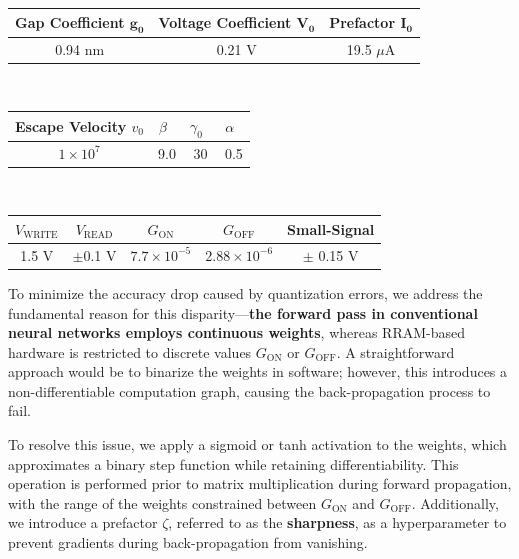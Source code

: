\documentclass[conference]{IEEEtran}  %
\begin{document}
\vspace*{-1mm}
\begin{table}[h]
    \centering
    \renewcommand{\arraystretch}{1.5} %
    \setlength{\tabcolsep}{1mm}       %
    \begin{tabular}{|c|c|c|}
    \hline
        Gap Coefficient $\mathbf{g_0}$ & Voltage Coefficient $\mathbf{V_0}$ & Prefactor $\mathbf{I_0}$ \\\hline
        0.94 nm & 0.21 V & 19.5 $\mu$A \\\hline
    \end{tabular}\\
    \vspace*{2mm}
    \renewcommand{\arraystretch}{1.5} %
    \begin{tabular}{|c|c|c|c|}
    \hline
        Escape Velocity $v_0$ & $\beta$~\cite{b2} & $\gamma_0$~\cite{b2} & $\alpha$~\cite{b2} \\\hline
        $1 \times 10^7$ & 9.0 & 30 & 0.5 \\\hline
    \end{tabular}\\
    \vspace*{2mm}
    \renewcommand{\arraystretch}{1.5} %
    \begin{tabular}{|c|c|c|c|c|}
    \hline
        $V_{\text{WRITE}}$ & $V_{\text{READ}}$ & $G_{\text{ON}}$ & $G_{\text{OFF}}$ & Small-Signal \\\hline
        1.5 V & $\pm$0.1 V & $7.7 \times 10^{-5}$ & $2.88 \times 10^{-6}$ & $\pm$ 0.15 V \\\hline
    \end{tabular}
\end{table}

To minimize the accuracy drop caused by quantization errors, we address the fundamental reason for this disparity—\textbf{the forward pass in conventional neural networks employs continuous weights}, whereas RRAM-based hardware is restricted to discrete values \( G_{\text{ON}} \) or \( G_{\text{OFF}} \). A straightforward approach would be to binarize the weights in software; however, this introduces a non-differentiable computation graph, causing the back-propagation process to fail. 

To resolve this issue, we apply a sigmoid or tanh activation to the weights, which approximates a binary step function while retaining differentiability. This operation is performed prior to matrix multiplication during forward propagation, with the range of the weights constrained between \( G_{\text{ON}} \) and \( G_{\text{OFF}} \). Additionally, we introduce a prefactor \(\zeta\), referred to as the \textbf{sharpness}, as a hyperparameter to prevent gradients during back-propagation from vanishing.
\end{document}
